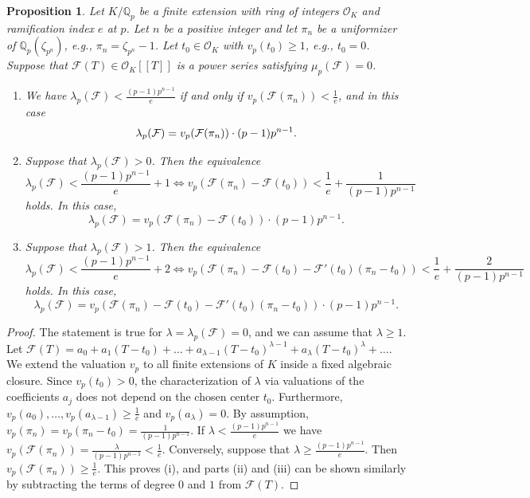 \documentclass[pdflatex,sn-mathphys-num]{sn-jnl}%
\theoremstyle{plain}
\newtheorem{prop}[thm]{Proposition}
\theoremstyle{definition}
\theoremstyle{remark}
\numberwithin{equation}{section}
\newcommand{\QQ}{\mathbb{Q}}
\begin{document}
\begin{prop} Let $K/\QQ_p$ be a finite extension with ring of integers $\mathcal{O}_K$ and ramification index $e$ at $p$. Let $n$ be a positive integer  and let 
$\pi_n $ be a uniformizer of $\QQ_p(\zeta_{p^n})$, 
e.g.,  $\pi_n = \zeta_{p^n} - 1$. 
Let $t_0 \in \mathcal{O}_K$ with $v_p(t_0) \geq 1$, e.g., $t_0=0$. 
Suppose that
$\mathcal{F}(T)  \in \mathcal{O}_K[[T]]$ is a power series satisfying $\mu_p(\mathcal{F})=0$. 
\begin{enumerate}
\item[(i)] We have $\lambda_p(\mathcal{F}) < \frac{(p-1)p^{n-1}}{e}$ if and only if  $v_p(\mathcal{F}(\pi_n )) < \frac{1}{e}$, and in this case
$$ \lambda_p(\mathcal{F}) = v_p(\mathcal{F}(\pi_n ))\cdot (p-1)p^{n-1} .\\ $$ 
\item[(ii)] Suppose that $\lambda_p(\mathcal{F}) > 0$. Then the equivalence 
$$\lambda_p(\mathcal{F}) < \frac{(p-1)p^{n-1}}{e} + 1 \Longleftrightarrow v_p(\mathcal{F}(\pi_n ) - \mathcal{F}(t_0)) <  \frac{1}{e} + \frac{1}{(p-1)p^{n-1}}$$
holds. In this case,
$$  \lambda_p(\mathcal{F})  = v_p(\mathcal{F}(\pi_n ) - \mathcal{F}(t_0)) \cdot (p-1)p^{n-1}   .$$
\item[(iii)] Suppose that $\lambda_p(\mathcal{F}) > 1$. Then  the equivalence 
$$\lambda_p(\mathcal{F}) < \frac{(p-1)p^{n-1}}{e} + 2 \Longleftrightarrow v_p(\mathcal{F}(\pi_n ) - \mathcal{F}(t_0) -   \mathcal{F}'(t_0)(\pi_n - t_0)) <  \frac{1}{e} + \frac{2}{(p-1)p^{n-1}}$$
holds. In this case,
$$  \lambda_p(\mathcal{F})  = v_p(\mathcal{F}(\pi_n ) - \mathcal{F}(t_0) -   \mathcal{F}'(t_0 ) (\pi_n - t_0) ) \cdot (p-1)p^{n-1}  .$$

\end{enumerate}

\label{secondkind}
\end{prop}

\begin{proof} The statement is true for $\lambda= \lambda_p(\mathcal{F})=0$, and we can assume that $\lambda   \geq 1$. 
Let $\mathcal{F}(T)=a_0 + a_1 (T-t_0) + \dots + a_{\lambda-1}(T-t_0)^{\lambda -1} + a_{\lambda} (T-t_0)^{\lambda} + \dots $. 
We extend the valuation $v_p$ to all finite extensions of $K$ inside a fixed algebraic closure. 
Since $v_p(t_0) > 0$,  
the characterization of $\lambda$ via valuations of the coefficients $a_j$ does not depend on the chosen center $t_0$.
Furthermore, $v_p(a_0), \dots , v_p(a_{\lambda-1}) \geq  \frac{1}{e}$ and $v_p(a_{\lambda})=0$. By assumption, $v_p(\pi_n) = v_p(\pi_n - t_0) = \frac{1}{(p-1)p^{n-1}}$. If $\lambda <  \frac{(p-1)p^{n-1}}{e}$ we have $v_p(\mathcal{F}(\pi_n)) = \frac{\lambda}{(p-1)p^{n-1}} < \frac{1}{e}$. Conversely, suppose that $\lambda \geq \frac{(p-1)p^{n-1}}{e}$.
Then  $v_p(\mathcal{F}(\pi_n )) \geq \frac{1}{e}$. 
This proves (i), and parts (ii) and (iii) can be shown similarly by subtracting the terms of degree $0$ and $1$  from $\mathcal{F}(T)$.
\end{proof}
\end{document}
